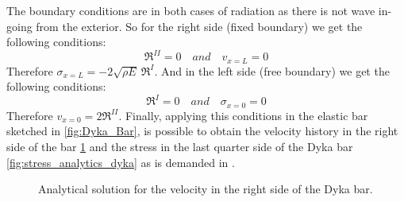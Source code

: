 The boundary conditions are in both cases of radiation as there is not
wave in-going from the exterior. So for the right side (fixed
boundary) we get the following conditions:
\begin{equation*}
  \Re^{II} = 0 \quad and \quad v_{x=L} = 0
\end{equation*}
Therefore $\sigma_{x=L} = -2\sqrt{\rho E}\ \Re^{I}$. And in the left side
(free boundary) we get the following conditions:
\begin{equation*}
  \Re^{I} = 0 \quad and \quad \sigma_{x=0} = 0
\end{equation*}
Therefore $v_{x=0} = 2\Re^{II}$. Finally, applying this conditions in
the elastic bar sketched in \ref{fig:Dyka_Bar}, is possible to obtain
the velocity history in the right side of the bar
\ref{fig:vel_analytics_dyka} and the stress in the last quarter side of the Dyka
bar \ref{fig:stress_analytics_dyka} as is demanded in \cite{Dyka1995}.

\begin{figure}\sidecaption
  \centering
  \caption[Velocities values in the right side of the Dyka
  bar]{Analytical solution for the velocity in the right side of the Dyka bar.}
  \label{fig:vel_analytics_dyka}
\end{figure}


